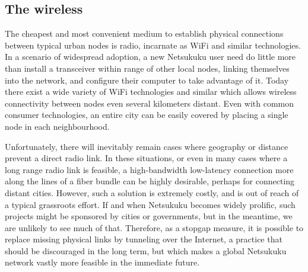 \documentclass[a4paper]{article}
\begin{document}
\subsection{The wireless}

The cheapest and most convenient medium to establish physical connections between 
typical urban nodes is radio, incarnate as WiFi and similar technologies.  
In a scenario of widespread adoption, a new Netsukuku user need do little more
than install a transceiver within range of other local nodes, linking themselves
into the network, and configure their computer to take advantage of it. 
Today there exist a wide variety of WiFi technologies and similar which allows 
wireless connectivity between nodes even several kilometers distant.  
Even with common consumer technologies, an entire city can be easily covered
by placing a single node in each neighbourhood.

Unfortunately, there will inevitably remain cases where geography or
distance prevent a direct radio link. In these situations, or even 
in many cases where a long range radio link is feasible, a high-bandwidth 
low-latency connection more along the lines of a fiber bundle can be
highly desirable, perhaps for connecting distant cities.  
However, such a solution is extremely costly, and is out of reach 
of a typical grassroots effort.  If and when Netsukuku becomes 
widely prolific, such projects might be sponsored by cities or
governments, but in the meantime, we are unlikely to see much of that.  
Therefore, as a stopgap measure, it is possible to replace missing 
physical links by tunneling over the Internet\cite{inetdoc}, a practice 
that should be discouraged in the long term, but which makes a global
Netsukuku network vastly more feasible in the immediate future.


\end{document}
